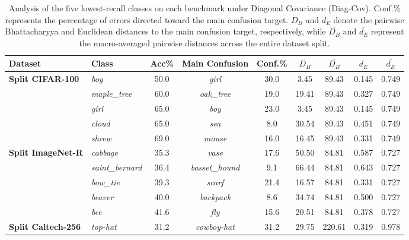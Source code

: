 \begin{table}[htbp]
	\centering
	\small
	\caption{Analysis of the five lowest-recall classes on each benchmark under Diagonal Covariance (Diag-Cov). $\text{Conf.}\%$ represents the percentage of errors directed toward the main confusion target. $D_B$ and $d_E$ denote the pairwise Bhattacharyya and Euclidean distances to the main confusion target, respectively, while $\overline{D_B}$ and $\overline{d_E}$ represent the macro-averaged pairwise distances across the entire dataset split.}
	\label{tab:worst_diag}
	\begin{adjustbox}{width=0.95\columnwidth, center}
		\small
		\begin{tabular}{llccccccc}
			\toprule
			\textbf{Dataset} & \textbf{Class} & \textbf{Acc\%} & \textbf{Main Confusion} & \textbf{Conf.\%} & $D_B$ & $\overline{D_B}$ & $d_E$ & $\overline{d_E}$ \\
			\midrule
			\textbf{Split CIFAR-100}
			& \textit{boy}          & 50.0 & \textit{girl}       & 30.0 &   3.45 & 89.43 & 0.145 & 0.749 \\
			& \textit{maple\_tree} & 60.0 & \textit{oak\_tree}  & 19.0 & 19.41 & 89.43 & 0.327 & 0.749 \\
			& \textit{girl}         & 65.0 & \textit{boy}        & 23.0 &   3.45 & 89.43 & 0.145 & 0.749 \\
			& \textit{cloud}        & 65.0 & \textit{sea}        &  8.0 & 30.54 & 89.43 & 0.451 & 0.749 \\
			& \textit{shrew}        & 69.0 & \textit{mouse}      & 16.0 & 16.45 & 89.43 & 0.331 & 0.749 \\
			\midrule
			\textbf{Split ImageNet-R}
			& \textit{cabbage}        & 35.3 & \textit{vase}           & 17.6 & 50.50 & 84.81 & 0.587 & 0.727 \\
			& \textit{saint\_bernard} & 36.4 & \textit{basset\_hound}  &  9.1 & 66.44 & 84.81 & 0.643 & 0.727 \\
			& \textit{bow\_tie}       & 39.3 & \textit{scarf}          & 21.4 & 16.57 & 84.81 & 0.331 & 0.727 \\
			& \textit{beaver}         & 40.0 & \textit{backpack}       &  8.6 & 34.74 & 84.81 & 0.500 & 0.727 \\
			& \textit{bee}            & 41.6 & \textit{fly}            & 15.6 & 20.51 & 84.81 & 0.378 & 0.727 \\
			\midrule
			\textbf{Split Caltech-256}
			& \textit{top-hat}        & 31.2 & \textit{cowboy-hat}     & 31.2 & 29.75 & 220.61 & 0.319 & 0.978 \\

\end{tabular}
\end{adjustbox}
\end{table}
